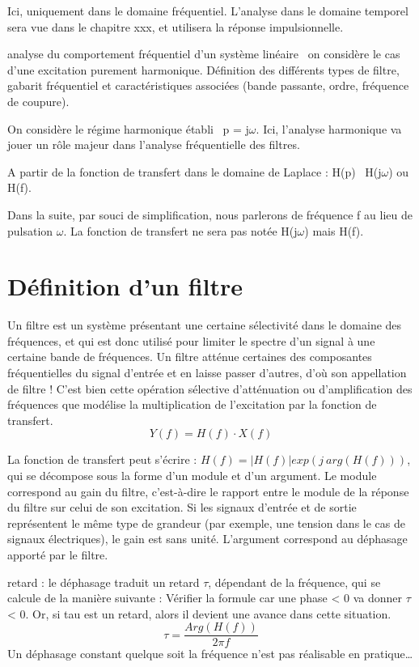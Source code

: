 \documentclass[]{book}
\begin{document}
{	Ici, uniquement dans le domaine fréquentiel. L'analyse dans le domaine
	temporel sera vue dans le chapitre xxx, et utilisera la réponse
	impulsionnelle.
	
	analyse du comportement fréquentiel d'un système linéaire~ on considère
	le cas d'une excitation purement harmonique. Définition des différents
	types de filtre, gabarit fréquentiel et caractéristiques associées
	(bande passante, ordre, fréquence de coupure).
	
	On considère le régime harmonique établi~ p = j$\omega$. Ici, l'analyse
	harmonique va jouer un rôle majeur dans l'analyse fréquentielle des
	filtres.
	
	A partir de la fonction de transfert dans le domaine de Laplace : H(p)~
	H(j$\omega$) ou H(f).
	
	Dans la suite, par souci de simplification, nous parlerons de fréquence
	f au lieu de pulsation $ \omega $. La fonction de transfert ne sera pas notée
	H(j$ \omega $) mais H(f).
	
	\section{Définition d'un filtre}
	Un filtre est un système présentant une certaine sélectivité dans le domaine des fréquences, et qui est donc utilisé pour limiter le spectre d’un signal à une certaine bande de fréquences.
	Un filtre atténue certaines des composantes fréquentielles du signal d’entrée et en laisse passer d’autres, d’où son appellation de filtre ! C’est bien cette opération sélective d’atténuation ou d’amplification des fréquences que modélise la multiplication de l'excitation par la fonction de transfert.
	\begin{equation}\label{}
	Y(f) = H(f) \cdot X(f)
	\end{equation}

	La fonction de transfert peut s'écrire : $ H(f) = |H(f)|exp(j~arg(H(f)))$, qui se décompose sous la forme d'un module et d'un argument. Le module correspond au gain du filtre, c'est-à-dire le rapport entre le module de la réponse du filtre sur celui de son excitation. Si les signaux d'entrée et de sortie représentent le même type de grandeur (par exemple, une tension dans le cas de signaux électriques), le gain est sans unité. L'argument correspond au déphasage apporté par le filtre.
	
	retard : le déphasage traduit un retard $ \tau $, dépendant de la fréquence,
	qui se calcule de la manière suivante : Vérifier la formule car une
	phase \textless{} 0 va donner $\tau$ \textless{} 0. Or, si tau est un
	retard, alors il devient une avance dans cette situation.
	\begin{equation}\label{}
	\tau = \frac{Arg(H(f))}{2\pi f}
	\end{equation}
	Un déphasage constant quelque soit la fréquence n'est pas réalisable en pratique…
	
}
\end{document}
